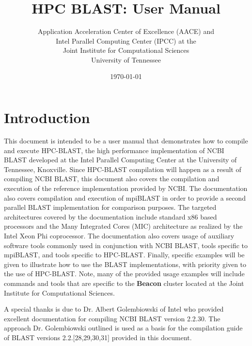 \documentclass[10pt]{article}
\newcommand{\beac}{\textbf{Beacon }}
\begin{document}
\title{HPC BLAST: User Manual\\
         }
\author{Application Acceleration Center of Excellence (AACE) and\\
   Intel Parallel Computing Center (IPCC) at the\\
   Joint Institute for Computational Sciences\\University of Tennessee}
\date{\today}
\maketitle

\newpage

\tableofcontents

\newpage



\section{Introduction} \label{sec:intro}

This document is intended to be a user manual that demonstrates how to compile and execute HPC-BLAST, the high performance implementation of NCBI BLAST developed at the Intel Parallel Computing Center at the University of Tennessee, Knoxville.
Since HPC-BLAST compilation will happen as a result of compiling NCBI BLAST, this document also covers the compilation and execution of the reference implementation provided by NCBI.  The documentation also covers compilation and execution of mpiBLAST in order to
provide a second parallel BLAST implementation for comparison purposes.  The targeted architectures covered by the documentation include standard x86 based processors and the Many Integrated Cores (MIC) architecture as realized by the Intel Xeon
Phi coprocessor.  The documentation also covers usage of auxiliary software tools commonly used in conjunction with NCBI BLAST, tools specific to mpiBLAST, and tools specific to HPC-BLAST.  Finally, specific examples will be given to illustrate how to
use the BLAST implementations, with priority given to the use of HPC-BLAST.  Note, many of the provided usage examples will include commands and tools that are specific to the \beac cluster located at the Joint Institute for Computational Sciences.

A special thanks is due to Dr. Albert Golembiowski of Intel who provided excellent documentation for compiling NCBI BLAST version 2.2.30.  The approach Dr. Golembiowski outlined is used as a basis for the compilation guide of BLAST versions 2.2.[28,29,30,31]
provided in this document.
\end{document}
